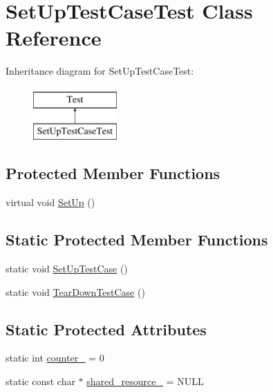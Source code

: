 \hypertarget{classtesting_1_1SetUpTestCaseTest}{\section{\-Set\-Up\-Test\-Case\-Test \-Class \-Reference}
\label{d8/d3b/classtesting_1_1SetUpTestCaseTest}
}
\-Inheritance diagram for \-Set\-Up\-Test\-Case\-Test\-:\begin{figure}[H]
\begin{center}
\leavevmode
\includegraphics[height=2.000000cm]{d8/d3b/classtesting_1_1SetUpTestCaseTest}
\end{center}
\end{figure}
\subsection*{\-Protected \-Member \-Functions}
\begin{DoxyCompactItemize}
\item 
virtual void \hyperlink{classtesting_1_1SetUpTestCaseTest_a901706a587f9ae84df8b2395fbe759cb}{\-Set\-Up} ()
\end{DoxyCompactItemize}
\subsection*{\-Static \-Protected \-Member \-Functions}
\begin{DoxyCompactItemize}
\item 
static void \hyperlink{classtesting_1_1SetUpTestCaseTest_aad8181b222f27240e9f07dcb6e620fa3}{\-Set\-Up\-Test\-Case} ()
\item 
static void \hyperlink{classtesting_1_1SetUpTestCaseTest_aaff0dc66f57f643a49ad3dd6bcb56916}{\-Tear\-Down\-Test\-Case} ()
\end{DoxyCompactItemize}
\subsection*{\-Static \-Protected \-Attributes}
\begin{DoxyCompactItemize}
\item 
static int \hyperlink{classtesting_1_1SetUpTestCaseTest_a3dd655f1f7e3481778d86bd515be83b3}{counter\-\_\-} = 0
\item 
static const char $\ast$ \hyperlink{classtesting_1_1SetUpTestCaseTest_ad219f67f3c407104d4956f33eb7116be}{shared\-\_\-resource\-\_\-} = \-N\-U\-L\-L
\end{DoxyCompactItemize}


